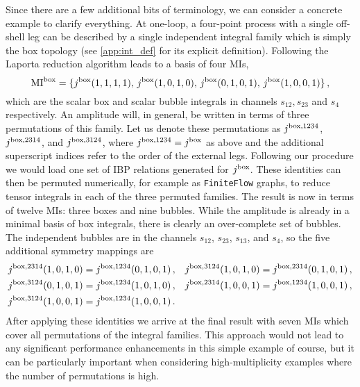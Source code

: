 Since there are a few additional bits of terminology, we can consider a concrete
example to clarify everything. At one-loop, a four-point process with a
single off-shell leg can be described by a single independent integral family
which is simply the box topology (see \cref{app:int_def} for its explicit definition). Following the Laporta reduction algorithm leads to a basis
of four \acp{MI},
\begin{equation}
	{\rm MI}^{\rm box} = \{j^{\rm box}(1,1,1,1),\, j^{\rm box}(1,0,1,0),\, j^{\rm box}(0,1,0,1),\, j^{\rm box}(1,0,0,1)\} \,,
\end{equation}
which are the scalar box and scalar bubble integrals in channels $s_{12},
s_{23}$ and $s_4$ respectively. An amplitude will, in general, be written in
terms of three permutations of this family. Let us denote
these permutations as $j^{\rm box, 1234}$, $j^{\rm box, 2314}$, and $j^{\rm box, 3124}$,
where $j^{\rm box, 1234} = j^{\rm box}$ as above and the additional superscript indices refer to the order of the external legs. Following our procedure we
would load one set of IBP relations generated for $j^{\rm box}$. These
identities can then be permuted numerically, for example as \texttt{FiniteFlow} graphs, to reduce
tensor integrals in each of the three permuted families. The result is now in terms
of twelve \acp{MI}: three boxes and nine bubbles. While the amplitude is already
in a minimal basis of box integrals, there is clearly an over-complete set of
bubbles. The independent bubbles are in the channels $s_{12}$, $s_{23}$,
$s_{13}$, and $s_4$, so the five additional symmetry mappings are
\begin{align}
	\begin{aligned}
		j^{\rm box, 2314}(1,0,1,0) &= j^{\rm box, 1234}(0,1,0,1) \,, &
		j^{\rm box, 3124}(1,0,1,0) &= j^{\rm box, 2314}(0,1,0,1) \,, \\
		j^{\rm box, 3124}(0,1,0,1) &= j^{\rm box, 1234}(1,0,1,0) \,, &
		j^{\rm box, 2314}(1,0,0,1) &= j^{\rm box, 1234}(1,0,0,1) \,, \\
		j^{\rm box, 3124}(1,0,0,1) &= j^{\rm box, 1234}(1,0,0,1) \,.
	\end{aligned}
\end{align}
After applying these identities we arrive at the final result with seven
\acp{MI} which cover all permutations of the integral families. 
This approach would not lead to any significant performance
enhancements in this simple example of course,
but it can be particularly important when considering
high-multiplicity examples where the number of permutations is
high.

